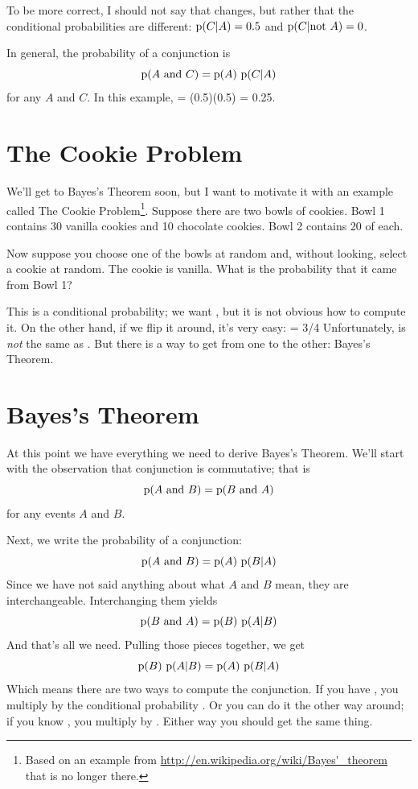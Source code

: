 \documentclass[12pt]{book}
\begin{document}
To be more correct, I should not say that  changes, but
rather that the conditional probabilities are different: $\mathrm{p}(C|A) = 0.5$
and $\mathrm{p}(C| \mathrm{not}~ A) = 0$.

In general, the probability of a conjunction is
%
\[ \mathrm{p}(A ~\mathrm{and}~ C) = \mathrm{p}(A)~\mathrm{p}(C|A) \]
%
for any $A$ and $C$.  In this example,  = (0.5)(0.5) = 0.25.


\section{The Cookie Problem}

We'll get to Bayes's Theorem soon, but I want to motivate it with an
example called The Cookie Problem\footnote{Based on an example from
  \url{http://en.wikipedia.org/wiki/Bayes'_theorem} that is no longer
  there.}.  Suppose there are two bowls of cookies.  Bowl 1 contains
  30 vanilla cookies and 10 chocolate cookies.  Bowl 2 contains 20 of
  each.

Now suppose you choose one of the bowls at random and, without looking,
select a cookie at random.  The cookie is vanilla.  What is the probability
that it came from Bowl 1?

This is a conditional probability; we want ,
but it is not obvious how to compute it.  On the other
hand, if we flip it around, it's very easy:
%
 = 3/4
%
Unfortunately,  is {\em not} the same as .  But there
is a way to get from one to the other: Bayes's Theorem.


\section{Bayes's Theorem}

At this point we have everything we need to derive Bayes's Theorem.
We'll start with the observation that conjunction is commutative; that is
%
\[ \mathrm{p}(A ~\mathrm{and}~ B) = \mathrm{p}(B ~\mathrm{and}~ A) \]
%
for any events $A$ and $B$.

Next, we write the probability of a conjunction:
%
\[ \mathrm{p}(A ~\mathrm{and}~ B) = \mathrm{p}(A)~\mathrm{p}(B|A) \]
%
Since we have not said anything about what $A$ and $B$ mean, they
are interchangeable.  Interchanging them yields
%
\[ \mathrm{p}(B ~\mathrm{and}~ A) = \mathrm{p}(B)~\mathrm{p}(A|B) \]
%
And that's all we need.  Pulling those pieces together, we get
%
\[ \mathrm{p}(B)~\mathrm{p}(A|B) = \mathrm{p}(A)~\mathrm{p}(B|A) \]
%
Which means there are two ways to compute the conjunction.
If you have , you multiply by the conditional
probability .  Or you can do it the other way around; if you
know , you multiply by .  Either way you should get
the same thing.
\end{document}
